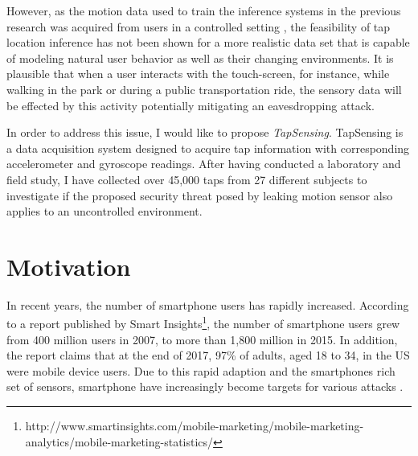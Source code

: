However, as the motion data used to train the inference systems in the previous research was acquired from users in a controlled setting \cite{Tapprints, Touchlogger, Accessory}, the feasibility of tap location inference has not been shown for a more realistic data set that is capable of modeling natural user behavior as well as their changing environments. It is plausible that when a user interacts with the touch-screen, for instance, while walking in the park or during a public transportation ride, the sensory data will be effected by this activity potentially mitigating an eavesdropping attack.

In order to address this issue, I would like to propose \textit{TapSensing}. TapSensing is a data acquisition system designed to acquire tap information with corresponding accelerometer and gyroscope readings. After having conducted a laboratory and field study, I have collected over 45,000 taps from 27 different subjects to investigate if the proposed security threat posed by leaking motion sensor also applies to an uncontrolled environment.


\section{Motivation}

In recent years, the number of smartphone users has rapidly
increased. According to a report published by Smart
Insights\footnote{http://www.smartinsights.com/mobile-marketing/mobile-marketing-analytics/mobile-marketing-statistics/}, the number of smartphone users grew from 400 million users in 2007, to more than 1,800 million in 2015. In addition, the report claims that at the end of 2017, 97\% of adults, aged 18 to 34, in the US were mobile device users. Due to this rapid adaption and the smartphones rich set of sensors, smartphone have increasingly become targets for various attacks \cite{Colp:2015:PDS:2694344.2694380, Aviv:2010:SAS:1925004.1925009, Touchlogger}.


